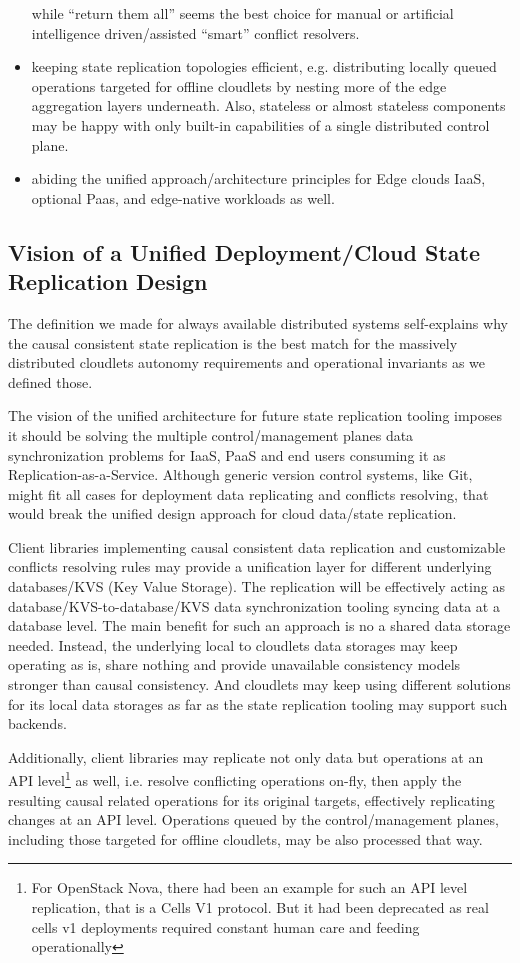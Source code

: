 \documentclass[conference]{IEEEtran}
\begin{document}
\begin{itemize}
    while ``return them all'' seems the best choice for manual or artificial
    intelligence driven/assisted ``smart'' conflict resolvers.
  \item keeping state replication topologies efficient, e.g. distributing
    locally queued operations targeted for offline cloudlets by nesting more of
    the edge aggregation layers underneath. Also, stateless or almost stateless
    components may be happy with only built-in capabilities of a single
    distributed control plane.
  \item abiding the unified approach/architecture principles for Edge clouds
    IaaS, optional Paas, and edge-native workloads as well.
\end{itemize}

\subsection{Vision of a Unified Deployment/Cloud State Replication Design}
The definition we made for always available distributed systems self-explains
why the causal consistent state replication is the best match for the
massively distributed cloudlets autonomy requirements and operational
invariants as we defined those.

The vision of the unified architecture for future state replication tooling
imposes it should be solving the multiple control/management planes data
synchronization problems for IaaS, PaaS and end users consuming it as
Replication-as-a-Service. Although generic version control systems, like Git,
might fit all cases for deployment data replicating and conflicts resolving,
that would break the unified design approach for cloud data/state replication.

Client libraries implementing causal consistent data replication and
customizable conflicts resolving rules may provide a unification layer for
different underlying databases/KVS (Key Value Storage). The replication will be
effectively acting as database/KVS-to-database/KVS data synchronization tooling
syncing data at a database level. The main benefit for such an approach is no a
shared data storage needed. Instead, the underlying local to cloudlets data
storages may keep operating as is, share nothing and provide unavailable
consistency models stronger than causal consistency. And cloudlets may keep
using different solutions for its local data storages as far as the state
replication tooling may support such backends.

Additionally, client libraries may replicate not only data but operations at an
API level\footnote{For OpenStack Nova, there had been an example for such an
API level replication, that is a Cells V1 protocol. But it had been deprecated
as real cells v1 deployments required constant human care and feeding
operationally} as well, i.e. resolve conflicting operations on-fly, then apply
the resulting causal related operations for its original targets, effectively
replicating changes at an API level. Operations queued by the
control/management planes, including those targeted for offline cloudlets, may
be also processed that way.
\end{document}

